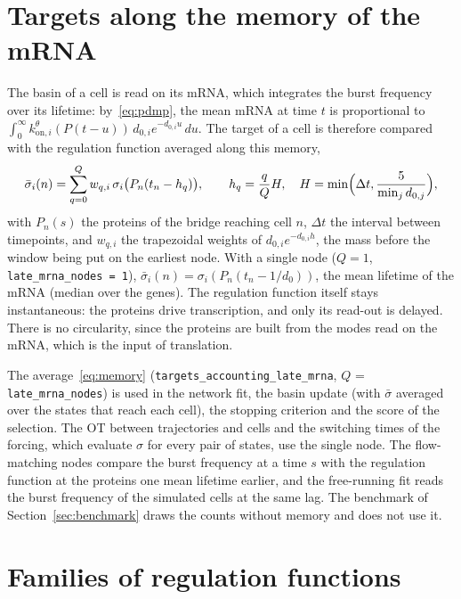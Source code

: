 \documentclass[a4paper, 11pt]{article}
\newcommand{\koni}{k_{\mathrm{on},i}^{\theta}}
\theoremstyle{plain}
\theoremstyle{remark}
\begin{document}
\section{Targets along the memory of the mRNA}\label{sec:memory}

The basin of a cell is read on its mRNA, which integrates the burst frequency over its lifetime: by~\eqref{eq:pdmp}, the mean mRNA at time $t$ is proportional to $\int_0^\infty \koni(P(t-u))\, d_{0,i}e^{-d_{0,i}u}\,du$. The target of a cell is therefore compared with the regulation function averaged along this memory,
\begin{equation}\label{eq:memory}
\bar\sigma_i(n) = \sum_{q=0}^{Q} w_{q,i}\, \sigma_i\bigl(P_n(t_n - h_q)\bigr), \qquad h_q = \frac{q}{Q}H, \quad H = \min\Bigl(\Delta t, \frac{5}{\min_j d_{0,j}}\Bigr),
\end{equation}
with $P_n(s)$ the proteins of the bridge reaching cell $n$, $\Delta t$ the interval between timepoints, and $w_{q,i}$ the trapezoidal weights of $d_{0,i}e^{-d_{0,i}h}$, the mass before the window being put on the earliest node. With a single node ($Q = 1$, \texttt{late\_mrna\_nodes = 1}), $\bar\sigma_i(n) = \sigma_i(P_n(t_n - 1/d_0))$, the mean lifetime of the mRNA (median over the genes). The regulation function itself stays instantaneous: the proteins drive transcription, and only its read-out is delayed. There is no circularity, since the proteins are built from the modes read on the mRNA, which is the input of translation.

The average~\eqref{eq:memory} (\texttt{targets\_accounting\_late\_mrna}, $Q$ = \texttt{late\_mrna\_nodes}) is used in the network fit, the basin update (with $\bar\sigma$ averaged over the states that reach each cell), the stopping criterion and the score of the selection. The OT between trajectories and cells and the switching times of the forcing, which evaluate $\sigma$ for every pair of states, use the single node. The flow-matching nodes compare the burst frequency at a time $s$ with the regulation function at the proteins one mean lifetime earlier, and the free-running fit reads the burst frequency of the simulated cells at the same lag. The benchmark of Section~\ref{sec:benchmark} draws the counts without memory and does not use it.

\section{Families of regulation functions}\label{sec:families}
\end{document}
